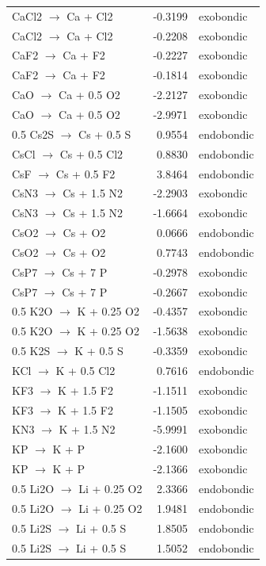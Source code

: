 \begin{longtable}{@{}lrl@{}}
CaCl2 $\rightarrow$ Ca + Cl2 & -0.3199 & exobondic \\
CaCl2 $\rightarrow$ Ca + Cl2 & -0.2208 & exobondic \\
CaF2 $\rightarrow$ Ca + F2 & -0.2227 & exobondic \\
CaF2 $\rightarrow$ Ca + F2 & -0.1814 & exobondic \\
CaO $\rightarrow$ Ca + 0.5 O2 & -2.2127 & exobondic \\
CaO $\rightarrow$ Ca + 0.5 O2 & -2.9971 & exobondic \\
0.5 Cs2S $\rightarrow$ Cs + 0.5 S & 0.9554 & endobondic \\
CsCl $\rightarrow$ Cs + 0.5 Cl2 & 0.8830 & endobondic \\
CsF $\rightarrow$ Cs + 0.5 F2 & 3.8464 & endobondic \\
CsN3 $\rightarrow$ Cs + 1.5 N2 & -2.2903 & exobondic \\
CsN3 $\rightarrow$ Cs + 1.5 N2 & -1.6664 & exobondic \\
CsO2 $\rightarrow$ Cs + O2 & 0.0666 & endobondic \\
CsO2 $\rightarrow$ Cs + O2 & 0.7743 & endobondic \\
CsP7 $\rightarrow$ Cs + 7 P & -0.2978 & exobondic \\
CsP7 $\rightarrow$ Cs + 7 P & -0.2667 & exobondic \\
0.5 K2O $\rightarrow$ K + 0.25 O2 & -0.4357 & exobondic \\
0.5 K2O $\rightarrow$ K + 0.25 O2 & -1.5638 & exobondic \\
0.5 K2S $\rightarrow$ K + 0.5 S & -0.3359 & exobondic \\
KCl $\rightarrow$ K + 0.5 Cl2 & 0.7616 & endobondic \\
KF3 $\rightarrow$ K + 1.5 F2 & -1.1511 & exobondic \\
KF3 $\rightarrow$ K + 1.5 F2 & -1.1505 & exobondic \\
KN3 $\rightarrow$ K + 1.5 N2 & -5.9991 & exobondic \\
KP $\rightarrow$ K + P & -2.1600 & exobondic \\
KP $\rightarrow$ K + P & -2.1366 & exobondic \\
0.5 Li2O $\rightarrow$ Li + 0.25 O2 & 2.3366 & endobondic \\
0.5 Li2O $\rightarrow$ Li + 0.25 O2 & 1.9481 & endobondic \\
0.5 Li2S $\rightarrow$ Li + 0.5 S & 1.8505 & endobondic \\
0.5 Li2S $\rightarrow$ Li + 0.5 S & 1.5052 & endobondic \\

\end{longtable}
